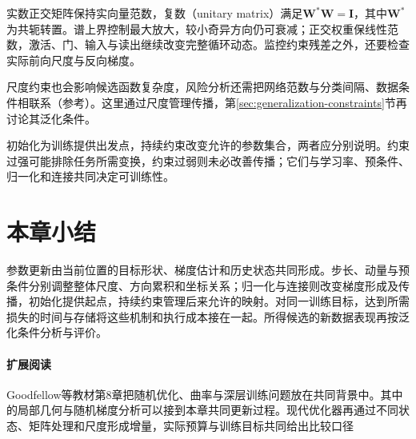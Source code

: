 实数正交矩阵保持实向量范数，复数（unitary matrix）满足$\bm W^*\bm W=\bm I$，其中$\bm W^*$为共轭转置。谱上界控制最大放大，较小奇异方向仍可衰减；正交权重保线性范数，激活、门、输入与读出继续改变完整循环动态。监控约束残差之外，还要检查实际前向尺度与反向梯度。

尺度约束也会影响候选函数复杂度，风险分析还需把网络范数与分类间隔、数据条件相联系（参考）。这里通过尺度管理传播，第\ref{sec:generalization-constraints}节再讨论其泛化条件。

初始化为训练提供出发点，持续约束改变允许的参数集合，两者应分别说明。约束过强可能排除任务所需变换，约束过弱则未必改善传播；它们与学习率、预条件、归一化和连接共同决定可训练性。

\section{本章小结}
\label{sec:training-summary}

参数更新由当前位置的目标形状、梯度估计和历史状态共同形成。步长、动量与预条件分别调整整体尺度、方向累积和坐标关系；归一化与连接则改变梯度形成及传播，初始化提供起点，持续约束管理后来允许的映射。对同一训练目标，达到所需损失的时间与存储将这些机制和执行成本接在一起。所得候选的新数据表现再按泛化条件分析与评价。

\paragraph{扩展阅读}
Goodfellow等教材第8章把随机优化、曲率与深层训练问题放在共同背景中。其中的局部几何与随机梯度分析可以接到本章共同更新过程。现代优化器再通过不同状态、矩阵处理和尺度形成增量，实际预算与训练目标共同给出比较口径
